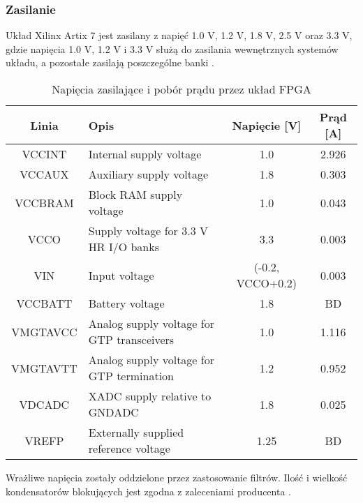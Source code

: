 \subsubsection{Zasilanie}
Układ Xilinx Artix 7 jest zasilany z napięć 1.0 V, 1.2 V, 1.8 V, 2.5 V oraz 3.3 V, gdzie napięcia 1.0 V, 1.2 V i 3.3 V służą do zasilania wewnętrznych systemów układu, a pozostałe zasilają poszczególne banki \cite{FPGA:DS181}. 


\begin{table}[h]
	\caption{Napięcia zasilające i pobór prądu przez układ FPGA }
    \begin{tabular}{c p{7.5cm} c c}
	\toprule
    \textbf{Linia} & \textbf{Opis} & \textbf{Napięcie [V]} & \textbf{Prąd [A]}\\
    \midrule
   VCCINT & 		Internal supply voltage 						&	1.0			&	2.926\\
    VCCAUX & 	Auxiliary supply voltage 						& 	1.8			&	0.303\\		
    VCCBRAM & 	Block RAM supply voltage 						& 	1.0			&	0.043\\
    VCCO & 		Supply voltage for 3.3 V HR I/O banks 				& 	3.3 			&	0.003\\
    VIN & 		Input voltage 							&	 (-0.2, VCCO+0.2)	&	0.003\\
    VCCBATT & 	Battery voltage 							& 	1.8			&	BD\\
    VMGTAVCC & 	Analog supply voltage for GTP transceivers			& 	1.0			&	1.116\\
    VMGTAVTT & 	Analog supply voltage for GTP termination			& 	1.2			&	0.952\\
    VDCADC & 	XADC supply relative to GNDADC 				&	1.8			&	0.025\\
    VREFP & 		Externally supplied reference voltage 				& 	1.25			&	BD\\
    \toprule
    \end{tabular}

	\label{tbl:fpga_power}
\end{table}
Wrażliwe napięcia zostały oddzielone przez zastosowanie filtrów. Ilość i wielkość kondensatorów blokujących jest zgodna z zaleceniami producenta \cite{UG483}. 

